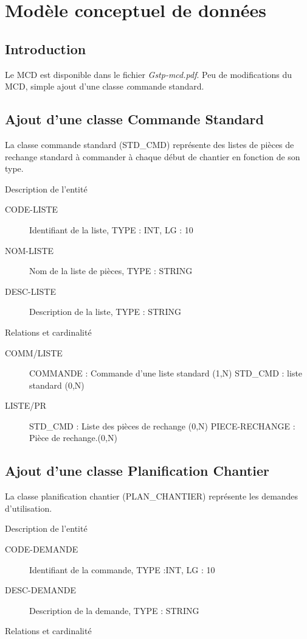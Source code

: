 \section{Modèle conceptuel de données}

\subsection{Introduction}
Le MCD est disponible dans le fichier {\sl Gstp-mcd.pdf}.
Peu de modifications du MCD, simple ajout d'une classe {\emph commande standard}.


\subsection{Ajout d'une classe Commande Standard}

La classe commande standard (STD\_CMD) représente des listes de pièces de 
rechange standard à commander à chaque début de chantier en fonction de son type.

\par{Description de l'entité}
\begin{description}
    \item[CODE-LISTE] Identifiant de la liste, TYPE : INT, LG : 10
    \item[NOM-LISTE] Nom de la liste de pièces, TYPE : STRING
    \item[DESC-LISTE] Description de la liste, TYPE : STRING
\end{description}

\par{Relations et cardinalité}
\begin{description}
    \item[COMM/LISTE] COMMANDE : Commande d'une liste standard (1,N)\el
        STD\_CMD : liste standard (0,N)
    \item[LISTE/PR] STD\_CMD : Liste des pièces de rechange (0,N)\el
        PIECE-RECHANGE :  Pièce de rechange.(0,N)
\end{description}

\subsection{Ajout d'une classe Planification Chantier}

La classe planification chantier (PLAN\_CHANTIER) représente les demandes
d'utilisation.

\par{Description de l'entité}
\begin{description}
    \item[CODE-DEMANDE] Identifiant de la commande, TYPE :INT, LG : 10
    \item[DESC-DEMANDE] Description de la demande, TYPE : STRING 
\end{description}

\par{Relations et cardinalité}
\begin{description}
    \item[]
\end{description}

